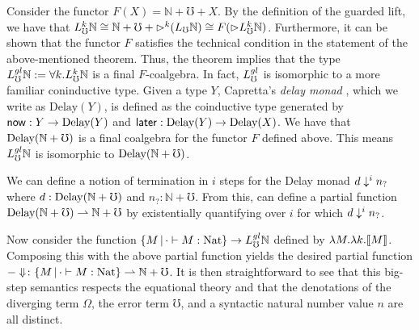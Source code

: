 Consider the functor $F(X) = \mathbb{N} + {\mho} + X$. By the definition of the
guarded lift, we have that
% 
$L_\mho^k \mathbb{N} 
  \cong \mathbb{N} + {\mho} + {\vartriangleright}^k (L_\mho \mathbb{N}) 
  \cong F({\vartriangleright} L_\mho^k \mathbb{N})$.
%
Furthermore, it can be shown that the functor $F$ satisfies the technical
condition in the statement of the above-mentioned theorem. Thus, the theorem
implies that the type $L_\mho^{gl} \mathbb{N} := \forall k. L_\mho^k \mathbb{N}$ is a
final $F$-coalgebra. In fact, $L_\mho^{gl}$ is isomorphic to a more familiar coninductive type.
%
Given a type $Y$, Capretta's \emph{delay monad} \cite{lmcs:2265},
which we write as $\text{Delay}(Y)$, is defined as the coinductive type
generated by $\mathsf{now} : Y \to \text{Delay}(Y)$ and $\mathsf{later} : \text{Delay}(Y) \to \text{Delay}(X)$.
We have that $\text{Delay} (\mathbb{N} + {\mho})$ is a final coalgebra for the functor
$F$ defined above. This means $L_\mho^{gl} \mathbb{N}$ is isomorphic to
$\text{Delay}(\mathbb{N} + {\mho})$.

We can define a notion of termination in $i$ steps for the Delay monad $d \downarrow^i
n_?$ where $d : \text{Delay}(\mathbb{N} + {\mho})$ and $n_? : \mathbb{N} + {\mho}$. From
this, can define a partial function $\text{Delay} (\mathbb{N} + {\mho})
\rightharpoonup \mathbb{N} + {\mho}$ by existentially quantifying over $i$
for which $d \downarrow^i n_?$.

Now consider the function $\{M \,|\, \cdot \vdash M : \text{Nat} \} \to L_\mho^{gl}
\mathbb{N}$ defined by $\lambda M. \lambda k .\llbracket {M} \rrbracket$. Composing this with the
above partial function yields the desired partial function $-\Downarrow \colon \{M
\,|\, \cdot \vdash M : \text{Nat} \} \rightharpoonup \mathbb{N} + {\mho}$. It is
then straightforward to see that this big-step semantics respects the equational
theory and that the denotations of the diverging term $\Omega$, the error term
$\mho$, and a syntactic natural number value $n$ are all distinct.

